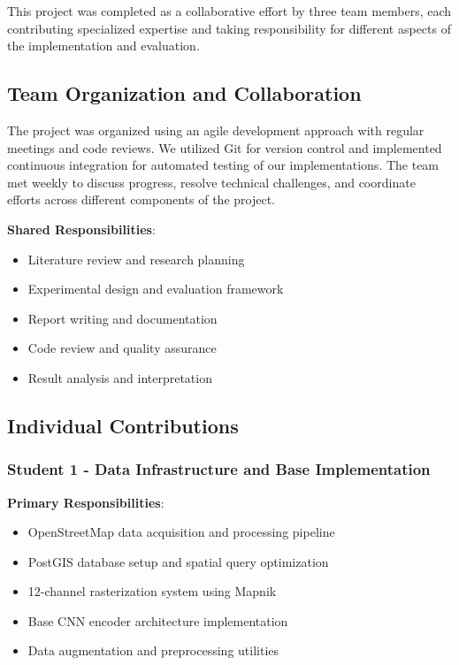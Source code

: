 This project was completed as a collaborative effort by three team members, each contributing specialized expertise and taking responsibility for different aspects of the implementation and evaluation.

\subsection{Team Organization and Collaboration}

The project was organized using an agile development approach with regular meetings and code reviews. We utilized Git for version control and implemented continuous integration for automated testing of our implementations. The team met weekly to discuss progress, resolve technical challenges, and coordinate efforts across different components of the project.

\textbf{Shared Responsibilities}:
\begin{itemize}
    \item Literature review and research planning
    \item Experimental design and evaluation framework
    \item Report writing and documentation
    \item Code review and quality assurance
    \item Result analysis and interpretation
\end{itemize}

\subsection{Individual Contributions}

\subsubsection{Student 1 - Data Infrastructure and Base Implementation}

\textbf{Primary Responsibilities}:
\begin{itemize}
    \item OpenStreetMap data acquisition and processing pipeline
    \item PostGIS database setup and spatial query optimization
    \item 12-channel rasterization system using Mapnik
    \item Base CNN encoder architecture implementation
    \item Data augmentation and preprocessing utilities
\end{itemize}

